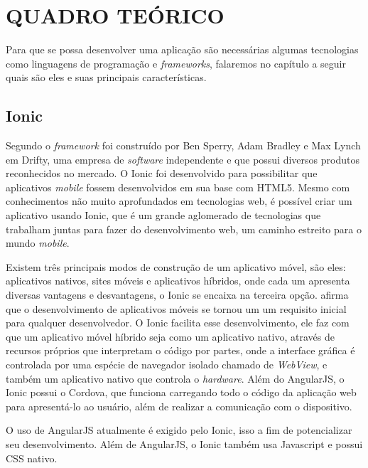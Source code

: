 \chapter{QUADRO TEÓRICO}

	\par Para que se possa desenvolver uma aplicação são necessárias algumas tecnologias como linguagens de programação e \textit{frameworks}, falaremos no capítulo a seguir quais são eles e suas principais características.

\section{Ionic}
	\par Segundo  o \textit{framework} foi construído por Ben Sperry, Adam Bradley e Max Lynch em Drifty, uma empresa de \textit{software} independente e que possui diversos produtos reconhecidos no mercado. O Ionic foi desenvolvido para possibilitar que aplicativos \textit{mobile} fossem desenvolvidos em sua base com HTML5. Mesmo com conhecimentos não muito aprofundados em tecnologias web, é possível criar um aplicativo usando Ionic, que é um grande aglomerado de tecnologias que trabalham juntas para fazer do desenvolvimento web, um caminho estreito para o mundo \textit{mobile}.
	
	\par Existem três principais modos de construção de um aplicativo móvel, são eles: aplicativos nativos, sites móveis e aplicativos híbridos, onde cada um apresenta diversas vantagens e desvantagens, o Ionic se encaixa na terceira opção.  afirma que o desenvolvimento de aplicativos móveis se tornou um um requisito inicial para qualquer desenvolvedor. O Ionic facilita esse desenvolvimento, ele faz com que um aplicativo móvel híbrido seja como um aplicativo nativo, através de recursos próprios que interpretam o código por partes, onde a interface gráfica é controlada por uma espécie de navegador isolado chamado de \textit{WebView}, e também um aplicativo nativo que controla o \textit{hardware}. Além do AngularJS, o Ionic possui o Cordova, que funciona carregando todo o código da aplicação web para apresentá-lo ao usuário, além de realizar a comunicação com o dispositivo.
	
	\par O uso de AngularJS atualmente é exigido pelo Ionic, isso a fim de potencializar seu desenvolvimento. Além de AngularJS, o Ionic também usa Javascript e possui CSS nativo.
	

